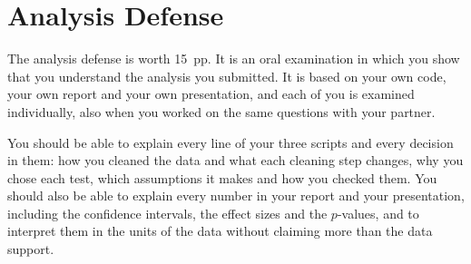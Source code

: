 \documentclass[11pt,a4paper]{article}
\begin{document}
\clearpage
\section{Analysis Defense}\label{sec:defense}

The analysis defense is worth 15~pp. It is an oral examination in which you show that you understand the analysis you submitted. It is based on your own code, your own report and your own presentation, and each of you is examined individually, also when you worked on the same questions with your partner.

You should be able to explain every line of your three scripts and every decision in them: how you cleaned the data and what each cleaning step changes, why you chose each test, which assumptions it makes and how you checked them. You should also be able to explain every number in your report and your presentation, including the confidence intervals, the effect sizes and the $p$-values, and to interpret them in the units of the data without claiming more than the data support.
\end{document}
